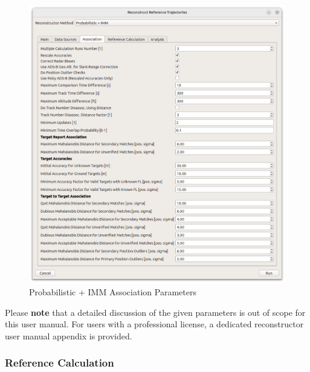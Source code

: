 \begin{figure}[H]
    \center
      \includegraphics[width=16cm]{figures/dialog_probimm_assoc.png}
    \caption{Probabilistic + IMM Association Parameters}
\end{figure}

Please \textbf{note} that a detailed discussion of the given parameters is out of scope for this user manual. For users with a professional license, a dedicated reconstructor user manual appendix is provided.

\subsubsection{Reference Calculation}

